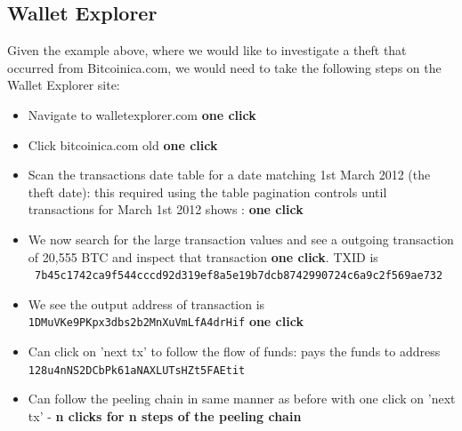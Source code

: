 \subsection{Wallet Explorer}
Given the example above, where we would like to investigate a theft that occurred from Bitcoinica.com, we would need to take the following steps on the Wallet Explorer site:
\begin{itemize}
    \item Navigate to walletexplorer.com \textbf{one click}
    \item Click bitcoinica.com old \textbf{one click}
    \item Scan the transactions date table for a date matching 1st March 2012 (the theft date): this required using the table pagination controls until transactions for March 1st 2012 shows : \textbf{one click}
    \item We now search for the large transaction values and see a outgoing transaction of 20,555 BTC and inspect that transaction \textbf{one click}. TXID is \\\texttt{    7b45c1742ca9f544cccd92d319ef8a5e19b7dcb8742990724c6a9c2f569ae732}
    \item We see the output address of transaction is \texttt{ 1DMuVKe9PKpx3dbs2b2MnXuVmLfA4drHif} \textbf{one click}
    \item Can click on 'next tx' to follow the flow of funds: pays the funds to address \\\texttt{128u4nNS2DCbPk61aNAXLUTsHZt5FAEtit}
    \item Can follow the peeling chain in same manner as before with one click on 'next tx' - \textbf{n clicks for n steps of the peeling chain}
\end{itemize}

